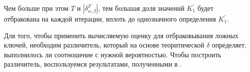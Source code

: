 \documentclass[utf8x, 14pt]{G7-32} %
\begin{document}
Чем больше при этом $T$ и $|\delta_{\alpha, \beta}^F|$, тем большая доля значений $K_1^{'}$ будет отбракована на каждой итерации, вплоть до однозначного определения $K_1^{'}$.

Для того, чтобы применить вычисляемую оценку для отбраковывания ложных ключей, необходим различитель, который на основе теоритической $\delta$ определяет, выполнилось ли соотношение с нужной вероятностью. Чтобы построить различитель, воспользуемся результатами, полученными в \cite{main_paper}.





\end{document}
